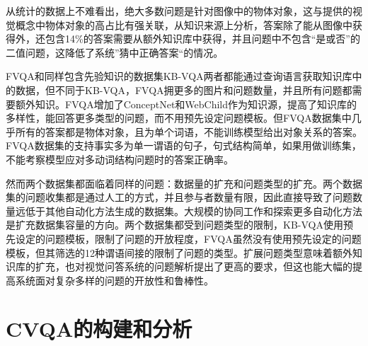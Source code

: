 从统计的数据上不难看出，绝大多数问题是针对图像中的物体对象，这与提供的视觉概念中物体对象的高占比有强关联，从知识来源上分析，答案除了能从图像中获得外，还包含14\%的答案需要从额外知识库中获得，并且问题中不包含“是或否”的二值问题，这降低了系统”猜中正确答案“的情况。

FVQA和同样包含先验知识的数据集KB-VQA两者都能通过查询语言获取知识库中的数据，但不同于KB-VQA，FVQA拥更多的图片和问题数量，并且所有问题都需要额外知识。FVQA增加了ConceptNet和WebChild作为知识源，提高了知识库的多样性，能回答更多类型的问题，而不用预先设定问题模板。但FVQA数据集中几乎所有的答案都是物体对象，且为单个词语，不能训练模型给出对象关系的答案。FVQA数据集的支持事实多为单一谓语的句子，句式结构简单，如果用做训练集，不能考察模型应对多动词结构问题时的答案正确率。

然而两个数据集都面临着同样的问题：数据量的扩充和问题类型的扩充。两个数据集的问题收集都是通过人工的方式，并且参与者数量有限，因此直接导致了问题数量远低于其他自动化方法生成的数据集。大规模的协同工作和探索更多自动化方法是扩充数据集容量的方向。两个数据集都受到问题类型的限制，KB-VQA使用预先设定的问题模板，限制了问题的开放程度，FVQA虽然没有使用预先设定的问题模板，但其筛选的12种谓语间接的限制了问题的类型。扩展问题类型意味着额外知识库的扩充，也对视觉问答系统的问题解析提出了更高的要求，但这也能大幅的提高系统面对复杂多样的问题的开放性和鲁棒性。

\section{CVQA的构建和分析}

